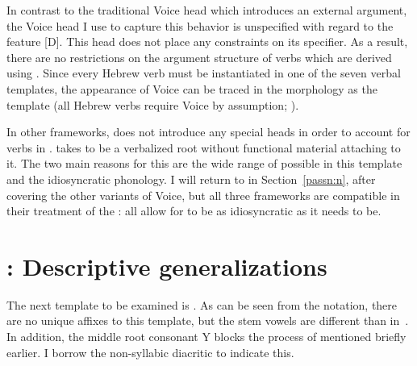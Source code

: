 \begin{exe}
\begin{xlist}
\begin{exe}
\begin{xlist}
\begin{exe}
\begin{xlist}
\begin{exe}
\begin{exe}
\begin{xlist}
\begin{exe}
\begin{xlist}
\begin{exe}
\begin{xlist}
\begin{exe}
\begin{xlist}
\begin{exe}
\begin{xlist}
\begin{exe}
\begin{xlist}
\begin{exe}
\begin{xlist}
\begin{exe}
\begin{xlist}
\begin{exe}
\begin{xlist}
\begin{exe}
\begin{xlist}
\begin{exe}
\begin{xlist}
\begin{exe}
\begin{xlist}
\begin{exe}
\begin{xlist}
\begin{exe}
\begin{exe}
\begin{xlist}
\begin{exe}
\begin{xlist}
\begin{exe}
\begin{xlist}
\begin{exe}
\begin{xlist}
{\begin{exe}
\begin{xlist}
\begin{exe}
\begin{xlist}
\begin{exe}
\begin{xlist}
\begin{exe}
\begin{xlist}
\begin{xlist}
\begin{xlist}
\begin{exe}
\begin{xlist}
\begin{xlist}
\begin{xlist}
\begin{exe}
\begin{exe}
\begin{xlist}
In contrast to the traditional Voice head which introduces an external argument, the Voice head I use to capture this behavior is unspecified with regard to the  feature [D]. This head does not place any constraints on its specifier. As a result, there are no restrictions on the argument structure of verbs which are derived using . Since every Hebrew verb must be instantiated in one of the seven verbal templates, the appearance of Voice can be traced in the morphology as the template {\tkal} (all Hebrew verbs require Voice by assumption; \citealt{arad05}).

In other frameworks, \cite{doron03} does not introduce any special heads in order to account for verbs in {\tkal}. \cite{borer13oup,borer15roots} takes {\tkal} to be a verbalized root without functional material attaching to it. The two main reasons for this are the wide range of  possible in this template and the idiosyncratic phonology. I will return to  in Section~\ref{passn:n}, after covering the other variants of Voice, but all three frameworks are compatible in their treatment of the {\tkal}: all allow for {\tkal} to be as idiosyncratic as it needs to be.

\section{\tpie: Descriptive generalizations} \label{voice:tpie}
The next template to be examined is {\tpie}. As can be seen from the notation, there are no unique affixes to this template, but the stem vowels are different than in~{\tkal}. In addition, the middle root consonant Y blocks the process of  mentioned briefly earlier. I borrow the non-syllabic diacritic  to indicate this.


\end{xlist}
\end{exe}
\end{exe}
\end{xlist}
\end{xlist}
\end{xlist}
\end{exe}
\end{xlist}
\end{xlist}
\end{xlist}
\end{exe}
\end{xlist}
\end{exe}
\end{xlist}
\end{exe}
\end{xlist}
\end{exe}}
\end{xlist}
\end{exe}
\end{xlist}
\end{exe}
\end{xlist}
\end{exe}
\end{xlist}
\end{exe}
\end{exe}
\end{xlist}
\end{exe}
\end{xlist}
\end{exe}
\end{xlist}
\end{exe}
\end{xlist}
\end{exe}
\end{xlist}
\end{exe}
\end{xlist}
\end{exe}
\end{xlist}
\end{exe}
\end{xlist}
\end{exe}
\end{xlist}
\end{exe}
\end{xlist}
\end{exe}
\end{xlist}
\end{exe}
\end{xlist}
\end{exe}
\end{xlist}
\end{exe}
\end{exe}
\end{xlist}
\end{exe}
\end{xlist}
\end{exe}
\end{xlist}
\end{exe}
